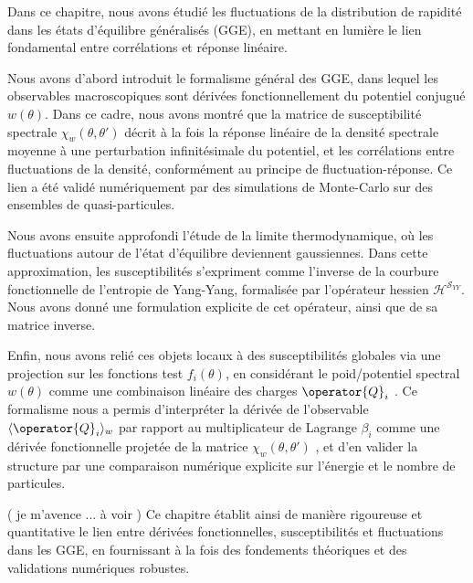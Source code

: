 {\color{blue} 
Dans ce chapitre, nous avons étudié les fluctuations de la distribution de rapidité dans les états d’équilibre généralisés (GGE), en mettant en lumière le lien fondamental entre corrélations et réponse linéaire.

Nous avons d’abord introduit le formalisme général des GGE, dans lequel les observables macroscopiques sont dérivées fonctionnellement du potentiel conjugué $w(\theta)$. Dans ce cadre, nous avons montré que la matrice de susceptibilité spectrale $\chi_w(\theta , \theta')$ décrit à la fois la réponse linéaire de la densité spectrale moyenne à une perturbation infinitésimale du potentiel, et les corrélations entre fluctuations de la densité, conformément au principe de fluctuation-réponse. Ce lien a été validé numériquement par des simulations de Monte-Carlo sur des ensembles de quasi-particules.

Nous avons ensuite approfondi l’étude de la limite thermodynamique, où les fluctuations autour de l’état d’équilibre deviennent gaussiennes. Dans cette approximation, les susceptibilités s’expriment comme l’inverse de la courbure fonctionnelle de l’entropie de Yang-Yang, formalisée par l’opérateur hessien $\mathcal{H}^{\mathcal{S}_{YY}}$. Nous avons donné une formulation explicite de cet opérateur, ainsi que de sa matrice inverse.

Enfin, nous avons relié ces objets locaux à des susceptibilités globales via une projection sur les fonctions test $f_i(\theta)$, en considérant le poid/potentiel spectral $w(\theta)$ comme une combinaison linéaire des charges $\operator{Q}_i$ . Ce formalisme nous a permis d’interpréter la dérivée de l’observable $\langle \operator{Q}_i \rangle_w$ par rapport au multiplicateur de Lagrange $\beta_i$ comme une dérivée fonctionnelle projetée de la matrice $\chi_w(\theta , \theta')$ , et d’en valider la structure par une comparaison numérique explicite sur l’énergie et le nombre de particules.

{\color{red} ( je m'avence ... à voir ) } 
Ce chapitre établit ainsi de manière rigoureuse et quantitative le lien entre dérivées fonctionnelles, susceptibilités et fluctuations dans les GGE, en fournissant à la fois des fondements théoriques et des validations numériques robustes.

}

